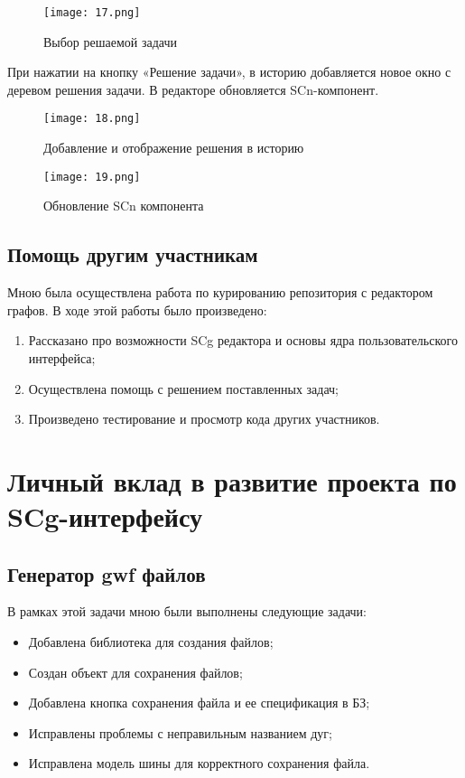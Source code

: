 \begin{figure}[H]
  \centering
  \texttt{[image: 17.png]}
  \caption{Выбор решаемой задачи}
  \label{fig:hardware:sdr_pipeline}
\end{figure}

При нажатии на кнопку «Решение задачи», в историю добавляется новое окно с деревом решения задачи. В редакторе обновляется SCn-компонент.

\begin{figure}[H]
  \centering
  \texttt{[image: 18.png]}
  \caption{Добавление и отображение решения в историю}
  \label{fig:hardware:sdr_pipeline}
\end{figure}

\begin{figure}[H]
  \centering
  \texttt{[image: 19.png]}
  \caption{Обновление SCn компонента}
  \label{fig:hardware:sdr_pipeline}
\end{figure}


\subsection{Помощь другим участникам}

Мною была осуществлена работа по курированию репозитория с редактором графов. В ходе этой работы было произведено:

\begin{enumerate}
\item{Рассказано про возможности SCg редактора и основы ядра пользовательского интерфейса;}
\item{Осуществлена помощь с решением поставленных задач;}
\item{Произведено тестирование и просмотр кода других участников.}
\end{enumerate}


\newpage
\section{Личный вклад в развитие проекта по SCg-интерфейсу}
\label{sec:domain3}

\subsection{Генератор gwf файлов}

В рамках этой задачи мною были выполнены следующие задачи:
\begin{itemize}
\item{Добавлена библиотека для создания файлов;}
\item{Создан объект для сохранения файлов;}
\item{Добавлена кнопка сохранения файла и ее спецификация в БЗ;}
\item{Исправлены проблемы с неправильным названием дуг;}
\item{Исправлена модель шины для корректного сохранения файла.}
\end{itemize}

